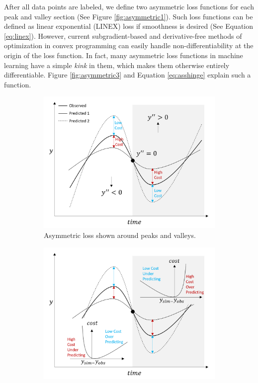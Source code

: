After all data points are labeled, we define two asymmetric loss functions for each peak and valley section (See Figure \ref{fig:asymmetric1}). Such loss functions can be defined as linear exponential (LINEX) loss if smoothness is desired (See Equation \ref{eq:linex}). However, current subgradient-based and derivative-free methods of optimization in convex programming can easily handle non-differentiability at the origin of the loss function. In fact, many asymmetric loss functions in machine learning have a simple \textit{kink} in them, which makes them otherwise entirely differentiable. Figure \ref{fig:asymmetric3} and Equation \ref{eq:asshinge} explain such a function. %

\begin{figure}[ht]
	\centering
	\begin{subfigure}{.5\textwidth}
  		\centering
 		 \includegraphics[width=\textwidth, trim={0 0 0 0}, clip=true]{plots/asymmetric1_a.png}
  		\caption{Asymmetric loss shown around peaks and valleys.\newline}
  		\label{fig:asymmetric1a}
	\end{subfigure}%
	\begin{subfigure}{.5\textwidth}
  		\centering
  		\includegraphics[width=\textwidth, trim={0 0 0 0}, clip=true]{plots/asymmetric1_b.png}

\end{subfigure}
\end{figure}
